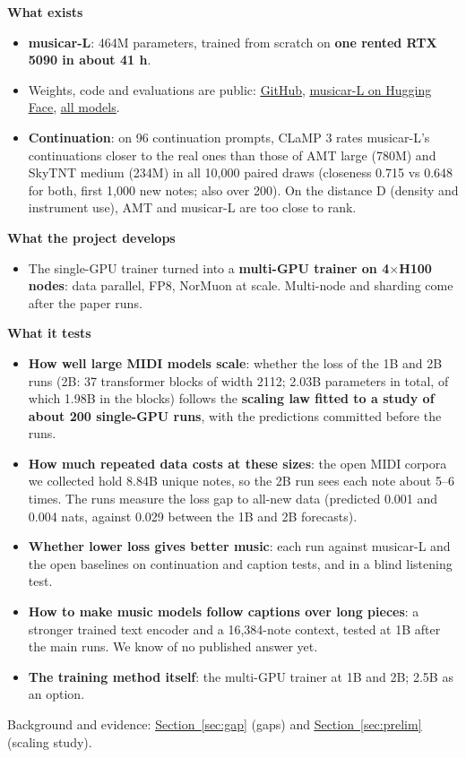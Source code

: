\documentclass[11pt,a4paper]{article}
\newcommand{\seclink}[2]{\hyperref[#1]{\textcolor{blue!60!black}{\underline{#2}}}}
\newcommand{\weblink}[2]{\href{#1}{\textcolor{blue!60!black}{\underline{#2}}}}
\begin{document}
\textbf{What exists}
\begin{itemize}
\item \textbf{musicar-L}: 464M parameters, trained from scratch on \textbf{one rented RTX 5090 in about 41 h}.
\item Weights, code and evaluations are public:
\weblink{https://github.com/DmytroHilei/Music_generative_model}{GitHub},
\weblink{https://huggingface.co/Dimitri-206265/musicar-L}{musicar-L on Hugging Face},
\weblink{https://huggingface.co/Dimitri-206265}{all models}.
\item \textbf{Continuation}: on 96 continuation prompts, CLaMP 3 rates musicar-L's continuations closer to the real
ones than those of AMT large (780M) and SkyTNT medium (234M) in all 10,000 paired draws (closeness 0.715 vs 0.648
for both, first 1,000 new notes; also over 200). On the distance D (density and instrument use), AMT and musicar-L are
too close to rank.
\end{itemize}

\medskip
\textbf{What the project develops}
\begin{itemize}
\item The single-GPU trainer turned into a \textbf{multi-GPU trainer on 4$\times$H100 nodes}: data parallel, FP8,
NorMuon at scale. Multi-node and sharding come after the paper runs.
\end{itemize}

\medskip
\textbf{What it tests}
\begin{itemize}
\item \textbf{How well large MIDI models scale}: whether the loss of the 1B and 2B runs (2B: 37 transformer blocks of
width 2112; 2.03B parameters in total, of which 1.98B in the blocks) follows the \textbf{scaling law fitted to a study of about 200 single-GPU runs}, with the predictions committed
before the runs.
\item \textbf{How much repeated data costs at these sizes}: the open MIDI corpora we collected hold 8.84B unique notes, so the 2B run
sees each note about 5--6 times. The runs measure the loss gap to all-new data (predicted 0.001 and 0.004 nats,
against 0.029 between the 1B and 2B forecasts).
\item \textbf{Whether lower loss gives better music}: each run against musicar-L and the open baselines on
continuation and caption tests, and in a blind listening test.
\item \textbf{How to make music models follow captions over long pieces}: a stronger trained text encoder and a
16,384-note context, tested at 1B after the main runs. We know of no published answer yet.
\item \textbf{The training method itself}: the multi-GPU trainer at 1B and 2B; 2.5B as an option.
\end{itemize}
Background and evidence: \seclink{sec:gap}{Section~\ref*{sec:gap}} (gaps) and
\seclink{sec:prelim}{Section~\ref*{sec:prelim}} (scaling study).
\end{document}
